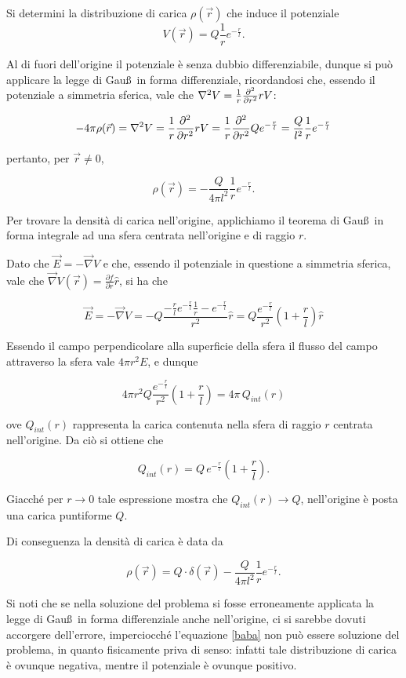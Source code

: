 \documentclass[../main.tex]{subfiles}
\begin{document}

\textex

Si determini la distribuzione di carica $\rho(\vec{r})$ che induce il potenziale
\begin{displaymath}
V(\vec{r})=Q\frac{1}{r}e^{-\frac{r}{l}}.
\end{displaymath}


\solution

 Al di fuori dell'origine il potenziale è senza dubbio differenziabile, dunque si può applicare la legge di Gau\ss\ in forma
 differenziale, ricordandosi che, essendo il potenziale a simmetria sferica, vale che
 $\nabla^2 V=\frac{1}{r}\frac{\partial^2}{\partial r^2}rV$:
 
 $$-4\pi\rho(\vec{r})=\nabla^2 V=\frac{1}{r}\frac{\partial^2}{\partial r^2}rV=
 \frac{1}{r}\frac{\partial^2 }{\partial r^2}Qe^{-\frac{r}{l} }=\frac{Q}{l^2}\frac{1}{r}e^{- \frac{r}{l}}$$
 
 pertanto, per $\vec{r}\ne 0$,
 
  \begin{equation}\label{baba}
  \rho(\vec{r})=-\frac{Q}{4\pi l^2}\frac{1}{r}e^{- \frac{r}{l}}.
  \end{equation}
 
 Per trovare la densità di carica nell'origine, applichiamo il teorema di Gau\ss\ in forma integrale ad una sfera centrata
 nell'origine e di raggio $r$.

 Dato che $\vec{E}=-\vec{\nabla}V$ e che, essendo il potenziale in questione a simmetria sferica, vale che
 $\vec{\nabla}V(\vec{r})=\frac{\partial f}{\partial r}\hat{r}$, si ha che

  $$\vec{E}=-\vec{\nabla}V=-Q \frac{-\frac{r}{l}e^{-\frac{r}{l}}\frac{1}{r}-e^{-\frac{r}{l}}}{r^2}\hat{r}=
  Q\frac{e^{-\frac{r}{l}}}{r^2}\left(1+\frac{r}{l}\right)\hat{r}$$
  
 Essendo il campo perpendicolare alla superficie della sfera il flusso del campo attraverso la sfera vale $4\pi r^2 E$,
 e dunque
 
  $$4\pi r^2Q\frac{e^{-\frac{r}{l}}}{r^2}\left(1+\frac{r}{l}\right)=4\pi\, Q_{int}(r)$$
 
 ove $Q_{int}(r)$ rappresenta la carica contenuta nella sfera di raggio $r$ centrata nell'origine. Da ciò si ottiene che
 
 $$Q_{int}(r)=Q\, e^{-\frac{r}{l}}\left(1+\frac{r}{l}\right).$$
 
 Giacché per $r\to 0$ tale espressione mostra che $Q_{int}(r)\to Q$, nell'origine è posta una carica puntiforme $Q$.
 
 Di conseguenza la densità di carica è data da
 
 $$\rho(\vec{r})=Q\cdot\delta(\vec{r})-\frac{Q}{4\pi l^2}\frac{1}{r}e^{- \frac{r}{l}}.$$
 
 Si noti che se nella soluzione del problema si fosse erroneamente applicata la legge di Gau\ss\ in forma differenziale anche
 nell'origine, ci si sarebbe dovuti accorgere dell'errore, imperciocché l'equazione \ref{baba} non può essere soluzione del
 problema, in quanto fisicamente priva di senso: infatti tale distribuzione di carica è ovunque negativa, mentre il potenziale
 è ovunque positivo.
\end{document}
